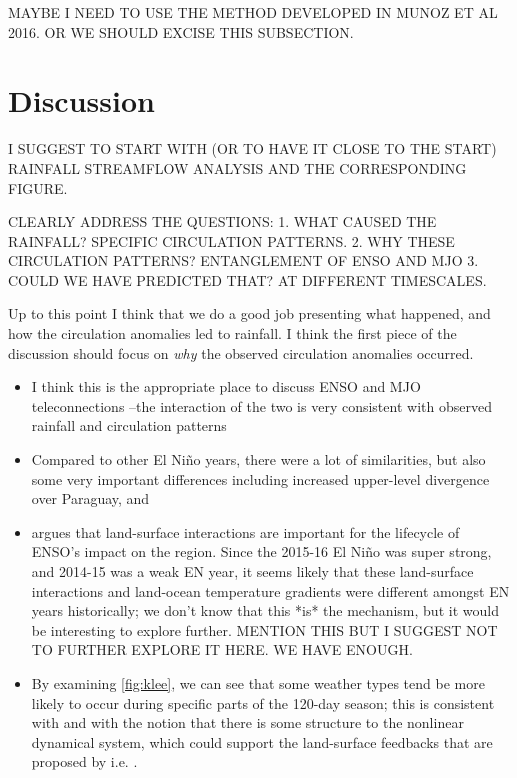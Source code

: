 \documentclass{ametsoc}
\begin{document}
MAYBE I NEED TO USE THE METHOD DEVELOPED IN MUNOZ ET AL 2016. OR WE SHOULD EXCISE THIS SUBSECTION.

\section{Discussion}
\label{sec:discussion}

I SUGGEST TO START WITH (OR TO HAVE IT CLOSE TO THE START) RAINFALL STREAMFLOW ANALYSIS AND THE CORRESPONDING FIGURE.

CLEARLY ADDRESS THE QUESTIONS:
1. WHAT CAUSED THE RAINFALL? SPECIFIC CIRCULATION PATTERNS.
2. WHY THESE CIRCULATION PATTERNS? ENTANGLEMENT OF ENSO AND MJO
3. COULD WE HAVE PREDICTED THAT? AT DIFFERENT TIMESCALES.

Up to this point I think that we do a good job presenting what happened, and how the circulation anomalies led to rainfall.
I think the first piece of the discussion should focus on \emph{why} the observed circulation anomalies occurred.
\begin{itemize}
	\item I think this is the appropriate place to discuss ENSO and MJO teleconnections --the interaction of the two is very consistent with observed rainfall and circulation patterns
	\item Compared to other El Ni\~{n}o years, there were a lot of similarities, but also some very important differences including increased upper-level divergence over Paraguay, and
	\item \citet{Grimm2009} argues that land-surface interactions are important for the lifecycle of ENSO's impact on the region.
	Since the 2015-16 El Ni\~no was super strong, and 2014-15 was a weak EN year, it seems likely that these land-surface interactions and land-ocean temperature gradients were different amongst EN years historically; we don't know that this *is* the mechanism, but it would be interesting to explore further. MENTION THIS BUT I SUGGEST NOT TO FURTHER EXPLORE IT HERE. WE HAVE ENOUGH.
	\item By examining \cref{fig:klee}, we can see that some weather types tend be more likely to occur during specific parts of the 120-day season; this is consistent with \citet{Munoz2016} and with the notion that there is some structure to the nonlinear dynamical system, which could support the land-surface feedbacks that are proposed by i.e. \citep{Grimm:2009bq}.
\end{itemize}
\end{document}
